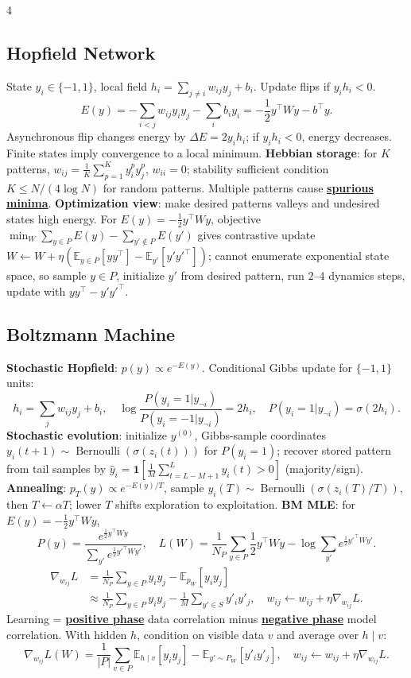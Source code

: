 \documentclass{article}
\newcommand{\key}[1]{\textbf{#1}}
\newcommand{\lowterm}[1]{\textbf{\underline{#1}}}
\newcommand{\E}{\mathbb{E}}
\newcommand{\1}{\mathbf 1}
\begin{document}
\begin{multicols*}{4}
\subsection{Hopfield Network}
State $y_i\in\{-1,1\}$, local field $h_i=\sum_{j\ne i}w_{ij}y_j+b_i$. Update flips if $y_ih_i<0$.
\[
E(y)=-\sum_{i<j}w_{ij}y_iy_j-\sum_i b_iy_i=-\frac12y^\top Wy-b^\top y.
\]
Asynchronous flip changes energy by $\Delta E=2y_ih_i$; if $y_ih_i<0$, energy decreases. Finite states imply convergence to a local minimum. \key{Hebbian storage}: for $K$ patterns, $w_{ij}=\frac1K\sum_{p=1}^K y_i^py_j^p$, $w_{ii}=0$; stability sufficient condition $K\le N/(4\log N)$ for random patterns. Multiple patterns cause \lowterm{spurious minima}.
\key{Optimization view}: make desired patterns valleys and undesired states high energy. For $E(y)=-\frac12y^\top Wy$, objective $\min_W\sum_{y\in P}E(y)-\sum_{y'\notin P}E(y')$ gives contrastive update
$W\leftarrow W+\eta(\E_{y\in P}[yy^\top]-\E_{y'}[y'y'^\top])$; cannot enumerate exponential state space, so sample $y\in P$, initialize $y'$ from desired pattern, run $2$--$4$ dynamics steps, update with $yy^\top-y'y'^\top$.

\subsection{Boltzmann Machine}
\key{Stochastic Hopfield}: $p(y)\propto e^{-E(y)}$. Conditional Gibbs update for $\{-1,1\}$ units:
\[
h_i=\sum_jw_{ij}y_j+b_i,\quad
\log\frac{P(y_i=1|y_{\neg i})}{P(y_i=-1|y_{\neg i})}=2h_i,\quad P(y_i=1|y_{\neg i})=\sigma(2h_i).
\]
\key{Stochastic evolution}: initialize $y^{(0)}$, Gibbs-sample coordinates $y_i(t+1)\sim\operatorname{Bernoulli}(\sigma(z_i(t)))$ for $P(y_i=1)$; recover stored pattern from tail samples by $\hat y_i=\mathbf1[\frac1M\sum_{t=L-M+1}^Ly_i(t)>0]$ (majority/sign).
\key{Annealing}: $p_T(y)\propto e^{-E(y)/T}$, sample $y_i(T)\sim\operatorname{Bernoulli}(\sigma(z_i(T)/T))$, then $T\leftarrow\alpha T$; lower $T$ shifts exploration to exploitation. \key{BM MLE}: for $E(y)=-\frac12y^\top Wy$,
\[
P(y)=\frac{e^{\frac12y^\top Wy}}{\sum_{y'}e^{\frac12y'^\top Wy'}},\quad
L(W)=\frac1{N_P}\sum_{y\in P}\frac12y^\top Wy-\log\sum_{y'}e^{\frac12y'^\top Wy'}.
\]
\[
\begin{aligned}
\nabla_{w_{ij}}L&=\frac1{N_P}\sum_{y\in P}y_iy_j-\E_{p_W}[y_iy_j]\\
&\approx\frac1{N_P}\sum_{y\in P}y_iy_j-\frac1M\sum_{y'\in S}y'_iy'_j,\quad
w_{ij}\leftarrow w_{ij}+\eta\nabla_{w_{ij}}L.
\end{aligned}
\]
Learning = \lowterm{positive phase} data correlation minus \lowterm{negative phase} model correlation. With hidden $h$, condition on visible data $v$ and average over $h\mid v$:
\[
\nabla_{w_{ij}}L(W)=\frac1{|P|}\sum_{v\in P}\E_{h\mid v}[y_iy_j]-\E_{y'\sim P_W}[y'_iy'_j],\quad
w_{ij}\leftarrow w_{ij}+\eta\nabla_{w_{ij}}L.
\]


\end{multicols*}
\end{document}
